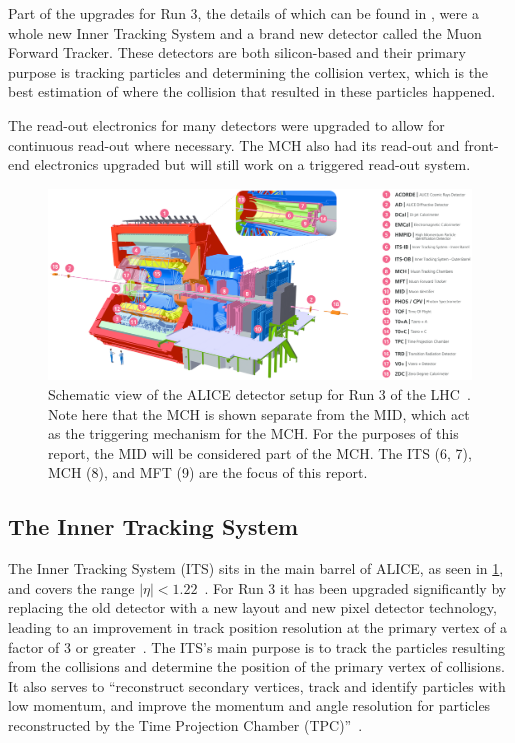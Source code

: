 Part of the upgrades for Run 3, the details of which can be found in \cite{ALICE_Upgrade_LOI}, were a whole new Inner Tracking System and a brand new detector called the Muon Forward Tracker. These detectors are both silicon-based and their primary purpose is tracking particles and determining the collision vertex, which is the best estimation of where the collision that resulted in these particles happened. 

The read-out electronics for many detectors were upgraded to allow for continuous read-out where necessary. The MCH also had its read-out and front-end electronics upgraded but will still work on a triggered read-out system.

\begin{figure}[h]
    \begin{center}
        \includegraphics[width=\textwidth]{Figs/ALICE_RUN3_schematic.png}
        \caption{Schematic view of the ALICE detector setup for Run 3 of the LHC~\cite{ALICE_schematic_labels}. Note here that the MCH is shown separate from the MID, which act as the triggering mechanism for the MCH. For the purposes of this report, the MID will be considered part of the MCH. The ITS (6, 7), MCH (8), and MFT (9) are the focus of this report.}
        \label{fig:ALICE_Schematic}
    \end{center}
\end{figure}


\subsection{The Inner Tracking System}
The Inner Tracking System (ITS) sits in the main barrel of ALICE, as seen in \cref{fig:ALICE_Schematic}, and covers the range $|\eta|<1.22$~\cite{ITS_Upgrade_TDR}. For Run 3 it has been upgraded significantly by replacing the old detector with a new layout and new pixel detector technology, leading to an improvement in track position resolution at the primary vertex of a factor of 3 or greater~\cite{ITS_Upgrade_TDR}. The ITS's main purpose is to track the particles resulting from the collisions and determine the position of the primary vertex of collisions. It also serves to ``reconstruct secondary vertices, track and identify particles with low momentum, and improve the momentum and angle resolution for particles reconstructed by the Time Projection Chamber (TPC)''~\cite{ITS_Info}.

